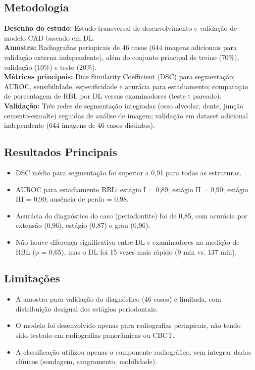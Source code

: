 \subsection{Metodologia}
\textbf{Desenho do estudo:} Estudo transversal de desenvolvimento e validação de
modelo CAD baseado em DL. \\
\textbf{Amostra:} Radiografias periapicais de 46 casos (644 imagens adicionais
para validação externa independente), além do conjunto principal de treino
(70\%), validação (10\%) e teste (20\%). \\
\textbf{Métricas principais:} Dice Similarity Coefficient (DSC) para
segmentação; AUROC, sensibilidade, especificidade e acurácia para estadiamento;
comparação de porcentagem de RBL por DL versus examinadores (teste t pareado). \\
\textbf{Validação:} Três redes de segmentação integradas (osso alveolar, dente,
junção cemento-esmalte) seguidas de análise de imagem; validação em dataset
adicional independente (644 imagens de 46 casos distintos).

\subsection{Resultados Principais}
\begin{itemize}
  \item DSC médio para segmentação foi superior a 0,91 para todas as estruturas.
  \item AUROC para estadiamento RBL: estágio I = 0,89; estágio II = 0,90;
        estágio III = 0,90; ausência de perda = 0,98.
  \item Acurácia do diagnóstico do caso (periodontite) foi de 0,85, com
        acurácia por extensão (0,96), estágio (0,87) e grau (0,96).
  \item Não houve diferença significativa entre DL e examinadores na medição
        de RBL (p = 0,65), mas o DL foi 15 vezes mais rápido (9 min vs. 137 min).
\end{itemize}

\subsection{Limitações}
\begin{itemize}
  \item A amostra para validação do diagnóstico (46 casos) é limitada, com
        distribuição desigual dos estágios periodontais.
  \item O modelo foi desenvolvido apenas para radiografias periapicais, não
        tendo sido testado em radiografias panorâmicas ou CBCT.
  \item A classificação utilizou apenas o componente radiográfico, sem integrar
        dados clínicos (sondagem, sangramento, mobilidade).
\end{itemize}

